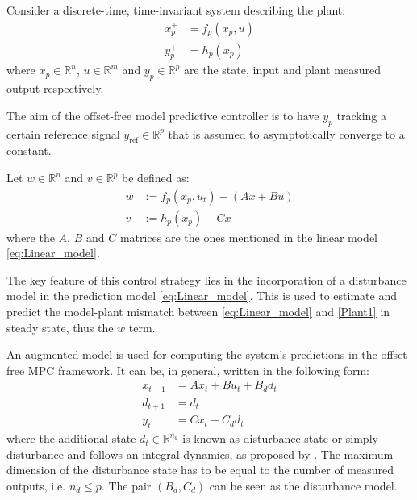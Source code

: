 \documentclass[a4paper,12pt,oneside]{book}
\begin{document}
\bigskip
Consider a discrete-time, time-invariant system describing the plant:
\begin{equation}
\begin{aligned}
    x_p^+ &= f_p (x_p, u) \\
    y_p^+ &= h_p (x_p) 
\end{aligned}
\label{Plant1}
\end{equation}
where $x_p \in \mathbb{R}^n$, $u \in \mathbb{R}^m$ and $y_p \in \mathbb{R}^p$ are the state, input and plant measured output respectively. 

The aim of the offset-free model predictive controller is to have $y_p$ tracking a certain reference signal $y_{\text{ref}} \in \mathbb{R}^p$ that is assumed to asymptotically converge to a constant.

\bigskip
Let $w \in \mathbb{R}^n$ and $v \in \mathbb{R}^p$ be defined as:
\begin{equation}
\begin{aligned}
    w & := f_p (x_p, u_t) - (A x + Bu) \\
    v & := h_p (x_p) - C x
\end{aligned}
\label{Plant_model_mismatch}
\end{equation}
where the $A$, $B$ and $C$ matrices are the ones mentioned in the linear model \ref{eq:Linear_model}.

\bigskip
The key feature of this control strategy lies in the incorporation of a disturbance model in the prediction model \ref{eq:Linear_model}.
This is used to estimate and predict the model-plant mismatch between \ref{eq:Linear_model} and \ref{Plant1} in steady state, thus the $w$ term. 

\bigskip
An augmented model is used for computing the system's predictions in the offset-free MPC framework. 
It can be, in general, written in the following form:
\begin{equation}
\begin{aligned}
    x_{t+1} &= A x_t + B u_t + B_d d_t \\
    d_{t+1} &= d_t \\
    y_t &= C x_t + C_d d_t
\end{aligned}
\label{Augmented_model}
\end{equation}
where the additional state $d_t \in \mathbb{R}^{n_d}$ is known as disturbance state or simply disturbance and follows an integral dynamics, as proposed by \cite{pannocchia2003disturbance}. 
The maximum dimension of the disturbance state has to be equal to the number of measured outputs, i.e. $n_d \leq p$.
The pair $(B_d, C_d)$ can be seen as the disturbance model.
\end{document}
